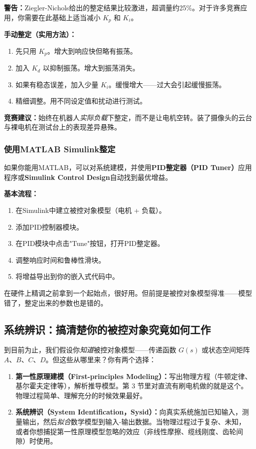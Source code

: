 \textbf{警告：}Ziegler-Nichols给出的整定结果比较激进，超调量约25\%。对于许多竞赛应用，你需要在此基础上适当减小 $K_p$ 和 $K_i$。

\textbf{手动整定（实用方法）：}
\begin{enumerate}
    \item 先只用 $K_p$。增大到响应快但略有振荡。
    \item 加入 $K_d$ 以抑制振荡。增大到振荡消失。
    \item 如果有稳态误差，加入少量 $K_i$。缓慢增大——过大会引起缓慢振荡。
    \item 精细调整。用不同设定值和扰动进行测试。
\end{enumerate}

\textbf{竞赛建议：}始终在机器人\textit{实际负载}下整定，而不是让电机空转。装了摄像头的云台与裸电机在测试台上的表现差异悬殊。

\subsubsection{使用MATLAB Simulink整定}

如果你能用MATLAB，可以对系统建模，并使用\textbf{PID整定器（PID Tuner）}应用程序或\textbf{Simulink Control Design}自动找到最优增益。

\textbf{基本流程：}
\begin{enumerate}
    \item 在Simulink中建立被控对象模型（电机 + 负载）。
    \item 添加PID控制器模块。
    \item 在PID模块中点击"Tune"按钮，打开PID整定器。
    \item 调整响应时间和鲁棒性滑块。
    \item 将增益导出到你的嵌入式代码中。
\end{enumerate}

在硬件上精调之前拿到一个起始点，很好用。但前提是被控对象模型得准——模型错了，整定出来的参数也是错的。

\subsection{系统辨识：搞清楚你的被控对象究竟如何工作}

到目前为止，我们假设你\textit{知道}被控对象模型——传递函数 $G(s)$ 或状态空间矩阵 $A$、$B$、$C$、$D$。但这些从哪里来？你有两个选择：

\begin{enumerate}
    \item \textbf{第一性原理建模（First-principles Modeling）：}写出物理方程（牛顿定律、基尔霍夫定律等），解析推导模型。第 3 节里对直流有刷电机做的就是这个。物理过程简单、理解充分的时候效果最好。
    \item \textbf{系统辨识（System Identification，Sysid）：}向真实系统施加已知输入，测量输出，然后\textit{拟合}数学模型到输入-输出数据。当物理过程过于复杂、未知，或者你想捕捉第一性原理模型忽略的效应（非线性摩擦、缆线刚度、齿轮间隙）时使用。
\end{enumerate}

